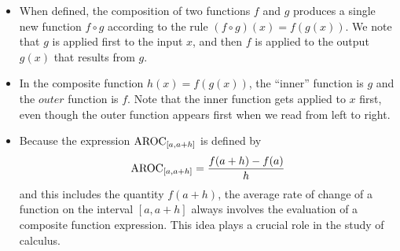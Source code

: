 \documentclass{ximera}
\begin{document}
\typeout{************************************************}
\typeout{************************************************}

\begin{summary}\begin{itemize}
\item When defined, the composition of two functions $f$ and $g$ produces a single new function $f \circ g$ according to the rule $(f \circ g)(x) = f(g(x))$.  We note that $g$ is applied first to the input $x$, and then $f$ is applied to the output $g(x)$ that results from $g$.
\item In the composite function $h(x) = f(g(x))$, the ``inner'' function is $g$ and the $outer$ function is $f$.  Note that the inner function gets applied to $x$ first, even though the outer function appears first when we read from left to right. 
\item Because the expression $\mathrm{AROC}_{[a,a+h]}$ is defined by%
\begin{equation*}
\mathrm{AROC}_{[a,a+h]} = \frac{f(a+h) - f(a)}{h} 
\end{equation*}
and this includes the quantity $f(a+h)$, the average rate of change of a function on the interval $[a,a+h]$ always involves the evaluation of a composite function expression.  This idea plays a crucial role in the study of calculus.
\end{itemize}\end{summary}
\end{document}
